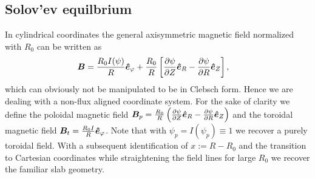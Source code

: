 \subsection{Solov'ev equilbrium}\label{sec:solovev}
In cylindrical coordinates the general axisymmetric magnetic field normalized with $R_0$ can be written as
\begin{align}
 {\boldsymbol{B}} &= \frac{R_0I(\psi)}{R} \bm{\hat{e}}_{\varphi} + \frac{R_0}{R}\left[\frac{\partial \psi}{\partial Z} \bm{\hat{e}}_R 
         -  \frac{\partial \psi}{\partial R} \bm{\hat{e}}_Z\right] ,
\end{align}
which can obviously not be manipulated to be in Clebsch form. Hence we are dealing with a non-flux aligned coordinate system.
For the sake of clarity we define the poloidal magnetic field \( {\boldsymbol{B}}_p = \frac{R_0}{R}\left( \frac{\partial \psi}{\partial Z}\bm{\hat{e}}_R - \frac{\partial \psi}{\partial R}\bm{\hat{e}}_Z\right)
\) and the toroidal magnetic field \({\boldsymbol{B}}_t =\frac{R_0I}{R} \bm{\hat{e}}_{\varphi}\).
Note that with $\psi_p = I(\psi_p) \equiv 1$ we recover a purely toroidal field.
With a subsequent identification of $x:=R-R_0$ and the transition to
Cartesian coordinates while straightening the field lines for large $R_0$
we recover the familiar slab geometry.


